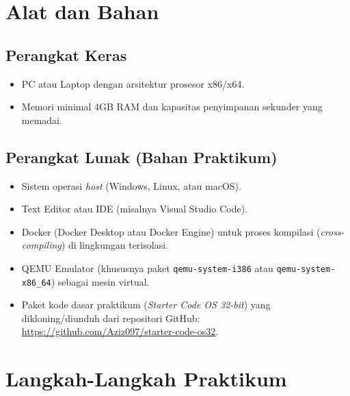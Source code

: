 \newpage
\section{Alat dan Bahan}
\label{sec:m07-alat-bahan}

\subsection{Perangkat Keras}
\begin{itemize}
    \item PC atau Laptop dengan arsitektur prosesor x86/x64.
    \item Memori minimal 4GB RAM dan kapasitas penyimpanan sekunder yang memadai.
\end{itemize}

\subsection{Perangkat Lunak (Bahan Praktikum)}
\begin{itemize}
    \item Sistem operasi \textit{host} (Windows, Linux, atau macOS).
    \item Text Editor atau IDE (misalnya Visual Studio Code).
    \item Docker (Docker Desktop atau Docker Engine) untuk proses kompilasi (\textit{cross-compiling}) di lingkungan terisolasi.
    \item QEMU Emulator (khususnya paket \texttt{qemu-system-i386} atau \texttt{qemu-system-x86\_64}) sebagai mesin virtual.
    \item Paket kode dasar praktikum (\textit{Starter Code OS 32-bit}) yang dikloning/diunduh dari repositori GitHub: \url{https://github.com/Aziz097/starter-code-os32}.
\end{itemize}

\newpage
\section{Langkah-Langkah Praktikum}

